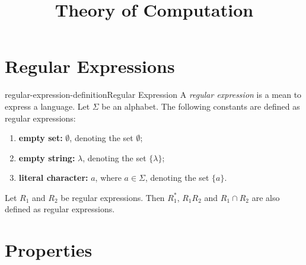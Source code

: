 \documentclass[preview]{standalone}
\newcommand{\emptyString}{\lambda}
\begin{document}
\title{Theory of Computation}
\genpage

\section{Regular Expressions}

\begin{snippetdefinition}{regular-expression-definition}{Regular Expression}
    A \textit{regular expression} is a mean to express a language.
    Let \(\Sigma\) be an alphabet.
    The following constants are defined as regular expressions:
    \begin{enumerate}
        \item \textbf{empty set:} \(\emptyset\), denoting the set \(\emptyset\);
        \item \textbf{empty string:} \(\emptyString\), denoting the set \(\{\emptyString\}\);
        \item \textbf{literal character:} \(a\), where \(a \in \Sigma\), denoting the set \(\{a\}\).
    \end{enumerate}
    Let \(R_1\) and \(R_2\) be regular expressions.
    Then \(R_1^*\), \(R_1 R_2\) and \(R_1 \cap R_2\) are also defined as regular expressions.
\end{snippetdefinition}


\section{Properties}
\end{document}
